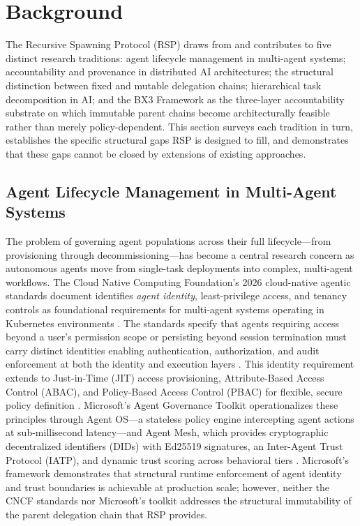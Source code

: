 \section{Background}
\label{sec:rs-background}

The Recursive Spawning Protocol (RSP) draws from and contributes to five distinct research traditions: agent lifecycle management in multi-agent systems; accountability and provenance in distributed AI architectures; the structural distinction between fixed and mutable delegation chains; hierarchical task decomposition in AI; and the BX3 Framework as the three-layer accountability substrate on which immutable parent chains become architecturally feasible rather than merely policy-dependent. This section surveys each tradition in turn, establishes the specific structural gaps RSP is designed to fill, and demonstrates that these gaps cannot be closed by extensions of existing approaches.

\subsection{Agent Lifecycle Management in Multi-Agent Systems}

The problem of governing agent populations across their full lifecycle---from provisioning through decommissioning---has become a central research concern as autonomous agents move from single-task deployments into complex, multi-agent workflows. The Cloud Native Computing Foundation's 2026 cloud-native agentic standards document identifies \emph{agent identity}, least-privilege access, and tenancy controls as foundational requirements for multi-agent systems operating in Kubernetes environments \cite{cncf-agentic-standards}. The standards specify that agents requiring access beyond a user's permission scope or persisting beyond session termination must carry distinct identities enabling authentication, authorization, and audit enforcement at both the identity and execution layers \cite{cncf-agentic-standards}. This identity requirement extends to Just-in-Time (JIT) access provisioning, Attribute-Based Access Control (ABAC), and Policy-Based Access Control (PBAC) for flexible, secure policy definition \cite{cncf-agentic-standards}. Microsoft's Agent Governance Toolkit operationalizes these principles through Agent OS---a stateless policy engine intercepting agent actions at sub-millisecond latency---and Agent Mesh, which provides cryptographic decentralized identifiers (DIDs) with Ed25519 signatures, an Inter-Agent Trust Protocol (IATP), and dynamic trust scoring across behavioral tiers \cite{microsoft-agent-governance}. Microsoft's framework demonstrates that structural runtime enforcement of agent identity and trust boundaries is achievable at production scale; however, neither the CNCF standards nor Microsoft's toolkit addresses the structural immutability of the parent delegation chain that RSP provides.

